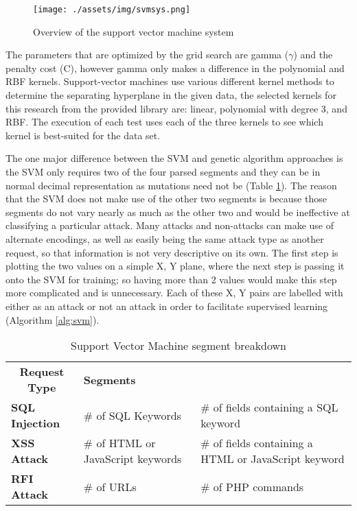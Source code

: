 \begin{figure}
	\texttt{[image: ./assets/img/svmsys.png]}
	\caption{Overview of the support vector machine system}
	\label{fig:svmsys}
\end{figure}

The parameters that are optimized by the grid search are gamma ($\gamma$) and the penalty cost (C), however gamma only makes a difference in the polynomial and RBF kernels.  Support-vector machines use various different kernel methods to determine the separating hyperplane in the given data, the selected kernels for this research from the provided library are: linear, polynomial with degree 3, and RBF.  The execution of each test uses each of the three kernels to see which kernel is best-suited for the data set.

The one major difference between the SVM and genetic algorithm approaches is the SVM only requires two of the four parsed segments and they can be in normal decimal representation as mutations need not be (Table \ref{tab:svmSegments}).  The reason that the SVM does not make use of the other two segments is because those segments do not vary nearly as much as the other two and would be ineffective at classifying a particular attack.  Many attacks and non-attacks can make use of alternate encodings, as well as easily being the same attack type as another request, so that information is not very descriptive on its own.  The first step is plotting the two values on a simple X, Y plane, where the next step is passing it onto the SVM for training; so having more than 2 values would make this step more complicated and is unnecessary.  Each of these X, Y pairs are labelled with either as an attack or not an attack in order to facilitate supervised learning (Algorithm \ref{alg:svm}).

\begin{table}
	\begin{tabular}{|p{1.5in}|p{2in}|p{2in}|}
	\hline
	\multicolumn{1}{|c|}{\textbf{Request Type}} & \multicolumn{2}{p{4in}|}{\textbf{Segments}}               \\ \hhline{|=|=|=|}
	\textbf{SQL Injection}                      & \# of SQL Keywords         & \# of fields containing a SQL keyword \\ \hline
	\textbf{XSS Attack}                      & \# of HTML or JavaScript keywords         & \# of fields containing a HTML or JavaScript keyword \\ \hline
	\textbf{RFI Attack}                      & \# of URLs         & \# of PHP commands \\ \hline
	\end{tabular}
	\caption{Support Vector Machine segment breakdown}
	\label{tab:svmSegments}
\end{table}

